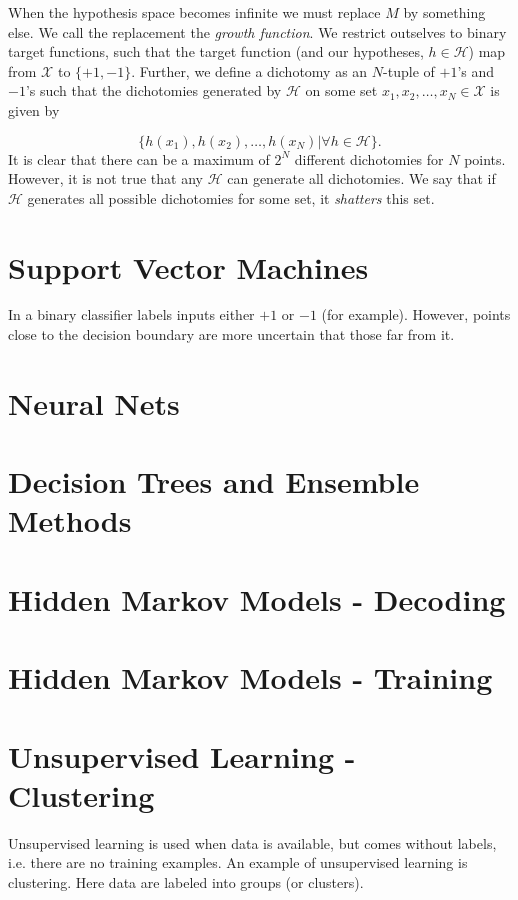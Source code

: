 \documentclass[oneside]{memoir}
\begin{document}
When the hypothesis space becomes infinite we must replace $M$ by something else. We call the replacement the \emph{growth function}. We restrict outselves to binary target functions, such that the target function (and our hypotheses, $h \in \mathcal{H}$) map from $\mathcal{X}$ to $\{+1,-1\}$. Further, we define a dichotomy as an $N$-tuple of $+1$'s and $-1$'s such that the dichotomies generated by $\mathcal{H}$ on some set $x_1,x_2,\dots,x_N \in \mathcal{X}$ is given by

\begin{equation}
  \label{dichotomies}
  \{h(x_1),h(x_2),\dots,h(x_N) | \forall h \in \mathcal{H}\}. 
\end{equation}
It is clear that there can be a maximum of $2^N$ different dichotomies for $N$ points. However, it is not true that any $\mathcal{H}$ can generate all dichotomies. We say that if $\mathcal{H}$ generates all possible dichotomies for some set, it \emph{shatters} this set. 


\section{Support Vector Machines}

In a binary classifier labels inputs either $+1$ or $-1$ (for example). However, points close to the decision boundary are more uncertain that those far from it.  


\section{Neural Nets}
\section{Decision Trees and Ensemble Methods}
\section{Hidden Markov Models - Decoding}
\section{Hidden Markov Models - Training}
\section{Unsupervised Learning - Clustering}

Unsupervised learning is used when data is available, but comes without labels, i.e. there are no training examples. An example of unsupervised learning is clustering. Here data are labeled into groups (or clusters).
\end{document}
